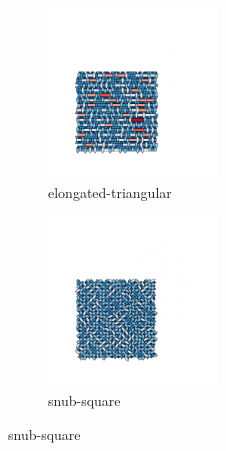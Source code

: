 \begin{figure}[bt]
     \centering
 
     \begin{subfigure}[b]{0.45\textwidth}
         \centering
         \includegraphics[height=4.5cm]{./figures/procrystals/pro_elong4.pdf}
         \caption{elongated\--triangular}
         \label{fig:pro45a}
     \end{subfigure}
     \hfill
     \begin{subfigure}[b]{0.45\textwidth}
         \centering
         \includegraphics[height=4.5cm]{./figures/procrystals/pro_snub4.pdf}
         \caption{snub\--square}
         \label{fig:pro45b}
     \end{subfigure}
     

\end{figure}
